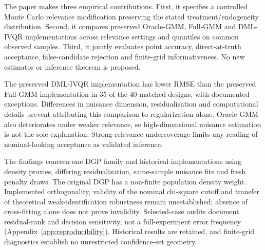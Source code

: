 The paper makes three empirical contributions. First, it specifies a controlled Monte Carlo relevance modification preserving the stated treatment/endogeneity distribution. Second, it compares preserved Oracle-GMM, Full-GMM and DML-IVQR implementations across relevance settings and quantiles on common observed samples. Third, it jointly evaluates point accuracy, direct-at-truth acceptance, false-candidate rejection and finite-grid informativeness. No new estimator or inference theorem is proposed.

The preserved DML-IVQR implementation has lower RMSE than the preserved Full-GMM implementation in 35 of the 40 matched designs, with documented exceptions. Differences in nuisance dimension, residualization and computational details prevent attributing this comparison to regularization alone. Oracle-GMM also deteriorates under weaker relevance, so high-dimensional nuisance estimation is not the sole explanation. Strong-relevance undercoverage limits any reading of nominal-looking acceptance as validated inference.

The findings concern one DGP family and historical implementations using density proxies, differing residualization, same-sample nuisance fits and fresh penalty draws. The original DGP has a non-finite population density weight. Implemented orthogonality, validity of the nominal chi-square cutoff and transfer of theoretical weak-identification robustness remain unestablished; absence of cross-fitting alone does not prove invalidity. Selected-case audits document residual-rank and decision sensitivity, not a full-experiment error frequency (Appendix~\ref{app:reproducibility}). Historical results are retained, and finite-grid diagnostics establish no unrestricted confidence-set geometry.
